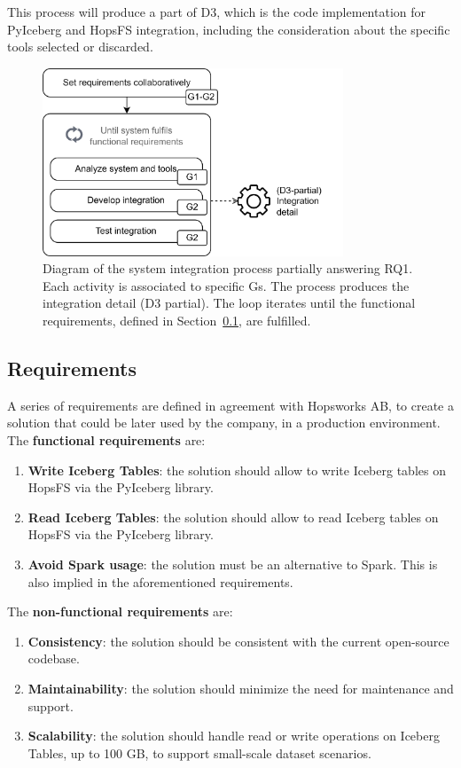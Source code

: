 This process will produce a part of \gls{D}3, which is the code implementation for PyIceberg and \gls{HopsFS} integration, including the consideration about the specific tools selected or discarded.

\begin{figure}[!t]
    \begin{center}
      \includegraphics[width=0.8\textwidth]{figures/3-method/method_code.png}
    \caption[System integration process]{Diagram of the system integration process partially answering \gls{RQ}1. Each activity is associated to specific \glspl{G}. The process produces the integration detail (\gls{D}3 partial). The loop iterates until the functional requirements, defined in Section~\ref{subsec:integration_reqs}, are fulfilled.}
    \label{fig:method_code_schema}
    \end{center}
\end{figure}


\subsection{Requirements}
\label{subsec:integration_reqs}
A series of requirements are defined in agreement with Hopsworks AB, to create a solution that could be later used by the company, in a production environment. The \textbf{functional requirements} are:
\begin{enumerate}
    \item \textbf{Write Iceberg Tables}: the solution should allow to write Iceberg tables on \gls{HopsFS} via the PyIceberg library.
    \item \textbf{Read Iceberg Tables}: the solution should allow to read Iceberg tables on \gls{HopsFS} via the PyIceberg library.
    \item \textbf{Avoid Spark usage}: the solution must be an alternative to Spark. This is also implied in the aforementioned requirements.
\end{enumerate}
The \textbf{non-functional requirements} are:
\begin{enumerate}
    \item \textbf{Consistency}: the solution should be consistent with the current open-source codebase.
    \item \textbf{Maintainability}: the solution should minimize the need for maintenance and support.
    \item \textbf{Scalability}: the solution should handle read or write operations on Iceberg Tables, up to 100 GB, to support small-scale dataset scenarios.
\end{enumerate}


